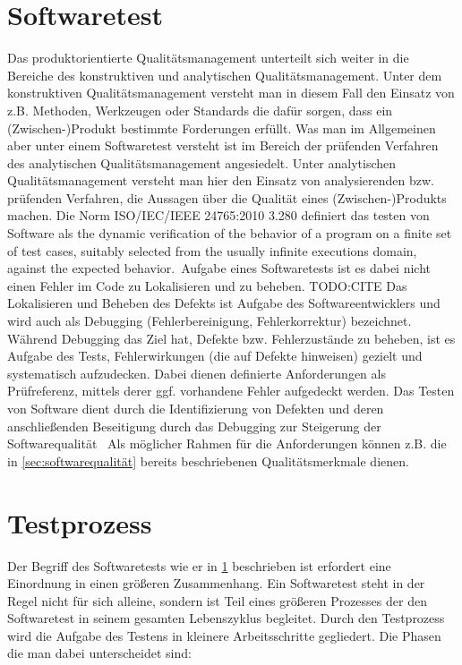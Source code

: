 \section{Softwaretest}
\label{sec:softwaretest}

Das produktorientierte Qualitätsmanagement unterteilt sich weiter in die Bereiche des konstruktiven und analytischen Qualitätsmanagement.
Unter dem konstruktiven Qualitätsmanagement versteht man in diesem Fall den Einsatz von z.B. Methoden, Werkzeugen oder Standards die dafür sorgen, dass ein (Zwischen-)Produkt bestimmte Forderungen erfüllt.
Was man im Allgemeinen aber unter einem Softwaretest versteht ist im Bereich der prüfenden Verfahren des analytischen Qualitätsmanagement angesiedelt.
Unter analytischen Qualitätsmanagement versteht man hier den Einsatz von analysierenden bzw. prüfenden Verfahren, die Aussagen über die Qualität eines (Zwischen-)Produkts machen. \newline
Die Norm ISO/IEC/IEEE 24765:2010 3.280 definiert das testen von Software als \glqq the dynamic verification of the behavior of a program on a finite set of test cases, suitably selected from the usually infinite executions domain, against the expected behavior.\grqq\
Aufgabe eines Softwaretests ist es dabei nicht einen Fehler im Code zu Lokalisieren und zu beheben. TODO:CITE
Das Lokalisieren und Beheben des Defekts ist Aufgabe des Softwareentwicklers und wird auch als Debugging (Fehlerbereinigung, Fehlerkorrektur) bezeichnet.
Während Debugging das Ziel hat, Defekte bzw. Fehlerzustände zu beheben, ist es Aufgabe des Tests, Fehlerwirkungen (die auf Defekte hinweisen) gezielt und systematisch aufzudecken. \cite{spillner_basiswissen_2003}
Dabei dienen definierte Anforderungen als Prüfreferenz, mittels derer ggf. vorhandene Fehler aufgedeckt werden.
\glqq Das Testen von Software dient durch die Identifizierung von Defekten und deren anschließenden Beseitigung durch das Debugging zur Steigerung der Softwarequalität\grqq\ \cite{spillner_basiswissen_2003}
Als möglicher Rahmen für die Anforderungen können z.B. die in \ref{sec:softwarequalität} bereits beschriebenen Qualitätsmerkmale dienen.


\section{Testprozess}
\label{sec:testprozess}

Der Begriff des Softwaretests wie er in \ref{sec:softwaretest} beschrieben ist erfordert eine Einordnung in einen größeren Zusammenhang. Ein Softwaretest steht in der Regel nicht für sich alleine, sondern ist Teil eines größeren Prozesses der den Softwaretest in seinem gesamten Lebenszyklus begleitet.
Durch den Testprozess wird die Aufgabe des Testens in kleinere Arbeitsschritte gegliedert.
Die Phasen die man dabei unterscheidet sind:

